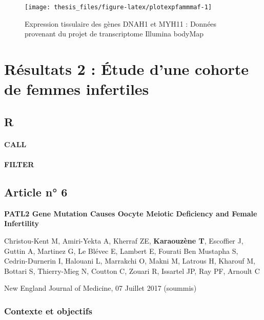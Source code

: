 \documentclass[12pt,twoside]{reedthesis}
\theoremstyle{definition}
\theoremstyle{definition}
\theoremstyle{remark}
\begin{document}
  \newpage
  
  \begin{figure}
  
  {\centering \texttt{[image: thesis\_files/figure-latex/plotexpfammmaf-1]} 
  
  }
  
  \caption[Expression tissulaire des gènes DNAH1 et MYH11]{Expression tissulaire des gènes DNAH1 et MYH11 : Données provenant du projet de transcriptome Illumina bodyMap}\label{fig:plotexpfammmaf}
  \end{figure}
  
  \newpage
  
  \section{Résultats 2 : Étude d'une cohorte de femmes
  infertiles}\label{resultats-2-etude-dune-cohorte-de-femmes-infertiles}
  
  \subsection{R}\label{r}
  
  \paragraph{CALL}\label{call}
  
  \paragraph{FILTER}\label{filter}
  
  \subsection{Article n° 6}\label{article-n-6}
  
  \textbf{PATL2 Gene Mutation Causes Oocyte Meiotic Deficiency and Female
  Infertility}
  
  Christou-Kent M, Amiri-Yekta A, Kherraf ZE, \textbf{Karaouzène T},
  Escoffier J, Guttin A, Martinez G, Le Blévec E, Lambert E, Fourati Ben
  Mustapha S, Cedrin-Durnerin I, Halouani L, Marrakchi O, Makni M, Latrous
  H, Kharouf M, Bottari S, Thierry-Mieg N, Coutton C, Zouari R, Issartel
  JP, Ray PF, Arnoult C
  
  New England Journal of Medicine, 07 Juillet 2017 (soummis)
  
  \newpage
  
  \subsubsection{Contexte et objectifs}\label{contexte-et-objectifs-3}
  
\end{document}
